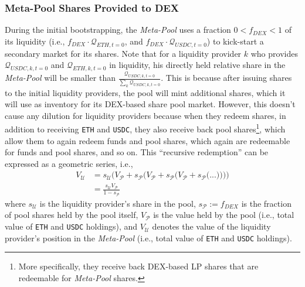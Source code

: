 \documentclass[a4paper]{article}
\begin{document}
\subsubsection{Meta-Pool Shares Provided to DEX}
\label{sec:meta-pool-shares}
During the initial bootstrapping, the \emph{Meta-Pool} uses a fraction $0<f_{DEX}<1$ of its liquidity (i.e., $f_{DEX} \cdot \mathcal{Q}_{ETH, t=0}$, and $f_{DEX} \cdot \mathcal{Q}_{USDC, t=0}$) to kick-start a secondary market for its shares. Note that for a liquidity provider $k$ who provides $\mathcal{Q}_{USDC, k, t=0}$ and $\mathcal{Q}_{ETH, k, t=0}$ in liquidity, his directly held relative share in the \emph{Meta-Pool} will be smaller than $\frac{\mathcal{Q}_{USDC, k, t=0}}{\sum_k \mathcal{Q}_{USDC, k, t=0}}$. This is because after issuing shares to the initial liquidity providers, the pool will mint additional shares, which it will use as inventory for its DEX-based share pool market. However, this doesn't cause any dilution for liquidity providers because when they redeem shares, in addition to receiving \verb|ETH| and \verb|USDC|, they also receive back pool shares\footnote{More specifically, they receive back DEX-based LP shares that are redeemable for \emph{Meta-Pool} shares.}, which allow them to again redeem funds and pool shares, which again are redeemable for funds and pool shares, and so on. This ``recursive redemption'' can be expressed as a geometric series, i.e.,
\begin{equation}
\begin{split}
\label{eq:meta-pool-share}
V_{\mathcal{U}} &= s_{\mathcal{U}} \Bigg( V_{\mathcal{P}} + s_{\mathcal{P}} \bigg( V_{\mathcal{P}} + s_{\mathcal{P}} \Big(  V_{\mathcal{P}} + s_{\mathcal{P}} \big( ... \big) \Big) \bigg) \Bigg)\\
 &= \frac{s_{\mathcal{U}} V_{\mathcal{P}}}{1 - s_{\mathcal{P}}}
\end{split}
\end{equation}
where $s_{\mathcal{U}}$ is the liquidity provider's share in the pool, $s_{\mathcal{P}}:=f_{DEX}$ is the fraction of pool shares held by the pool itself, $V_{\mathcal{P}}$ is the value held by the pool (i.e., total value of \verb|ETH| and \verb|USDC| holdings), and $V_{\mathcal{U}}$ denotes the value of the liquidity provider's position in the \emph{Meta-Pool} (i.e., total value of \verb|ETH| and \verb|USDC| holdings).\\
\end{document}
